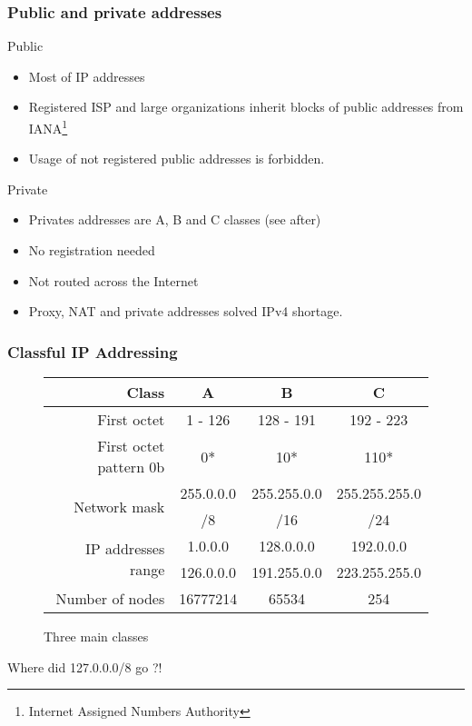   \begin{frame}
    \frametitle{Public and private addresses}
    \begin{block}{Public}
      \begin{itemize}
        \item Most of IP addresses \pause
        \item Registered ISP and large organizations inherit blocks of public addresses from IANA\footnote{Internet Assigned Numbers Authority} \pause
        \item Usage of not registered public addresses is forbidden.
      \end{itemize}
    \end{block}
    \begin{block}{Private}
      \begin{itemize}
        \item Privates addresses are A, B and C classes (see after)\pause
        \item No registration needed \pause
        \item Not routed across the Internet \pause
        \item Proxy, NAT and private addresses solved IPv4 shortage.
      \end{itemize}
    \end{block}
  \end{frame}

  
  \begin{frame}
    \frametitle{Classful IP Addressing}
    \begin{figure}
      \centering
      \begin{tabular}{|r||c|c|c|}
        \hline
        Class & A & B & C \\ \hline \hline
        First octet & 1 - 126 & 128 - 191 & 192 - 223 \\ \hline
        First octet pattern 0b& 0* & 10* & 110* \\ \hline
        \multirow{2}{*}{\color{brown}Network mask} & 255.0.0.0 & 255.255.0.0 & 255.255.255.0\\
         & /8 & /16 & /24 \\ \hline
        \multirow{2}{*}{IP addresses range} & 1.0.0.0 & 128.0.0.0 & 192.0.0.0\\
        & 126.0.0.0 & 191.255.0.0 & 223.255.255.0 \\ \hline
        Number of nodes & 16777214 & 65534 & 254 \\ \hline
      \end{tabular}
      \caption{Three main classes}
    \end{figure}
    Where did 127.0.0.0/8 go ?!
  \end{frame}

